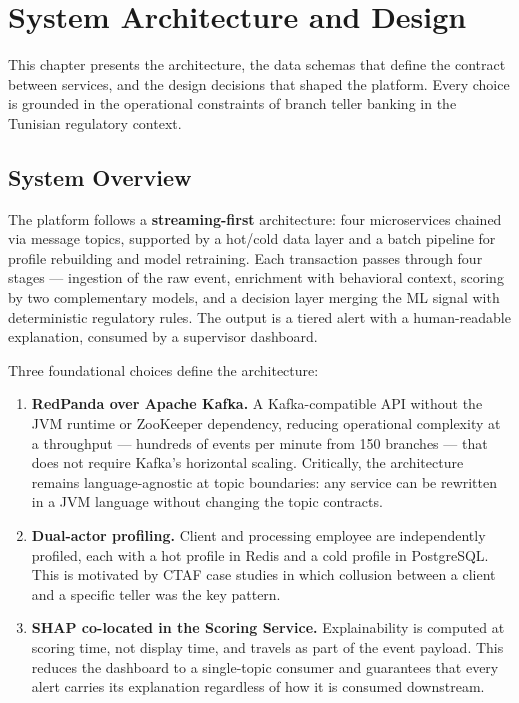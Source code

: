 \chapter{System Architecture and Design}
\label{ch:architecture}

This chapter presents the architecture, the data schemas that define the contract between services, and the design decisions that shaped the platform. Every choice is grounded in the operational constraints of branch teller banking in the Tunisian regulatory context.

\section{System Overview}

The platform follows a \textbf{streaming-first} architecture: four microservices chained via message topics, supported by a hot/cold data layer and a batch pipeline for profile rebuilding and model retraining. Each transaction passes through four stages --- ingestion of the raw event, enrichment with behavioral context, scoring by two complementary models, and a decision layer merging the ML signal with deterministic regulatory rules. The output is a tiered alert with a human-readable explanation, consumed by a supervisor dashboard.

Three foundational choices define the architecture:

\begin{enumerate}
  \item \textbf{RedPanda over Apache Kafka.} A Kafka-compatible API without the JVM runtime or ZooKeeper dependency, reducing operational complexity at a throughput --- hundreds of events per minute from 150 branches --- that does not require Kafka's horizontal scaling. Critically, the architecture remains language-agnostic at topic boundaries: any service can be rewritten in a JVM language without changing the topic contracts.
  \item \textbf{Dual-actor profiling.} Client and processing employee are independently profiled, each with a hot profile in Redis and a cold profile in PostgreSQL. This is motivated by CTAF case studies in which collusion between a client and a specific teller was the key pattern.
  \item \textbf{SHAP co-located in the Scoring Service.} Explainability is computed at scoring time, not display time, and travels as part of the event payload. This reduces the dashboard to a single-topic consumer and guarantees that every alert carries its explanation regardless of how it is consumed downstream.
\end{enumerate}


